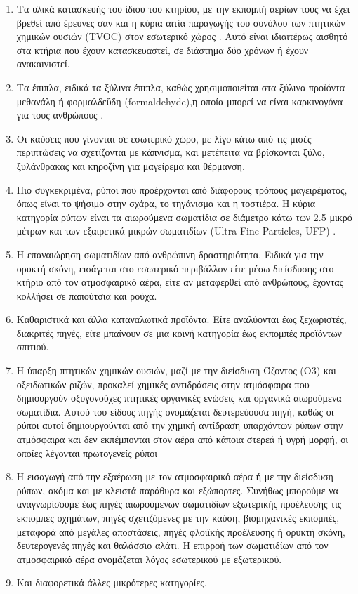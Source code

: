 \begin {enumerate}

\item Τα υλικά κατασκευής του ίδιου του κτηρίου, με την εκπομπή αερίων τους να έχει βρεθεί από έρευνες σαν και η κύρια αιτία παραγωγής του συνόλου των πτητικών χημικών ουσιών (TVOC) στον εσωτερικό χώρος \cite{GUO20112280}.
Αυτό είναι ιδιαιτέρως αισθητό στα κτήρια που έχουν κατασκευαστεί, σε διάστημα δύο χρόνων ή έχουν ανακαινιστεί.

\item Τα έπιπλα, ειδικά τα ξύλινα έπιπλα, καθώς χρησιμοποιείται  στα ξύλινα προϊόντα μεθανάλη ή φορμαλδεΰδη (formaldehyde),η οποία μπορεί να είναι καρκινογόνα για τους ανθρώπους \cite{Salthammer2010}.

\item Οι καύσεις που γίνονται σε εσωτερικό χώρο, με λίγο κάτω από τις μισές περιπτώσεις να σχετίζονται με κάπνισμα, και μετέπειτα να βρίσκονται ξύλο, ξυλάνθρακας και κηροζίνη για μαγείρεμα και θέρμανση.
\item Πιο συγκεκριμένα, ρύποι που προέρχονται από διάφορους τρόπους μαγειρέματος, όπως είναι το ψήσιμο στην σχάρα, το τηγάνισμα και η τοστιέρα. 
Η κύρια κατηγορία ρύπων είναι τα αιωρούμενα σωματίδια σε διάμετρο κάτω των 2.5 μικρό μέτρων και των εξαιρετικά μικρών σωματιδίων (Ultra Fine Particles, UFP) .
\item Η επαναιώρηση σωματιδίων από ανθρώπινη δραστηριότητα. Ειδικά για την ορυκτή σκόνη, εισάγεται στο εσωτερικό περιβάλλον είτε μέσω  διείσδυσης στο κτήριο από τον ατμοσφαιρικό αέρα, είτε αν μεταφερθεί από ανθρώπους, έχοντας κολλήσει σε παπούτσια και ρούχα.
\item Καθαριστικά και άλλα καταναλωτικά προϊόντα. Είτε αναλύονται έως ξεχωριστές, διακριτές πηγές, είτε μπαίνουν σε μια κοινή κατηγορία έως εκπομπές προϊόντων σπιτιού.
\item Η ύπαρξη πτητικών χημικών ουσιών, μαζί με την διείσδυση Όζοντος (O3) και οξειδωτικών ριζών, προκαλεί χημικές αντιδράσεις στην ατμόσφαιρα που δημιουργούν οξυγονούχες πτητικές οργανικές ενώσεις και οργανικά αιωρούμενα σωματίδια.
 Αυτού του είδους πηγής ονομάζεται δευτερεύουσα πηγή, καθώς οι ρύποι αυτοί δημιουργούνται από την χημική αντίδραση υπαρχόντων ρύπων στην ατμόσφαιρα και δεν εκπέμπονται στον αέρα από κάποια στερεά ή υγρή μορφή, οι οποίες λέγονται πρωτογενείς ρύποι
\item Η εισαγωγή από την εξαέρωση με τον ατμοσφαιρικό αέρα ή με την διείσδυση ρύπων, ακόμα και με κλειστά παράθυρα και εξώπορτες. 
Συνήθως μπορούμε να αναγνωρίσουμε έως πηγές αιωρούμενων σωματιδίων εξωτερικής προέλευσης τις εκπομπές οχημάτων, πηγές σχετιζόμενες με την καύση, βιομηχανικές εκπομπές, μεταφορά από μεγάλες αποστάσεις, πηγές φλοιϊκής προέλευσης ή ορυκτή σκόνη,
δευτερογενές πηγές και θαλάσσιο αλάτι. Η επιρροή των σωματιδίων από τον ατμοσφαιρικό αέρα ονομάζεται λόγος εσωτερικού με εξωτερικού. 
\item Και διαφορετικά άλλες μικρότερες κατηγορίες.
\end{enumerate}


